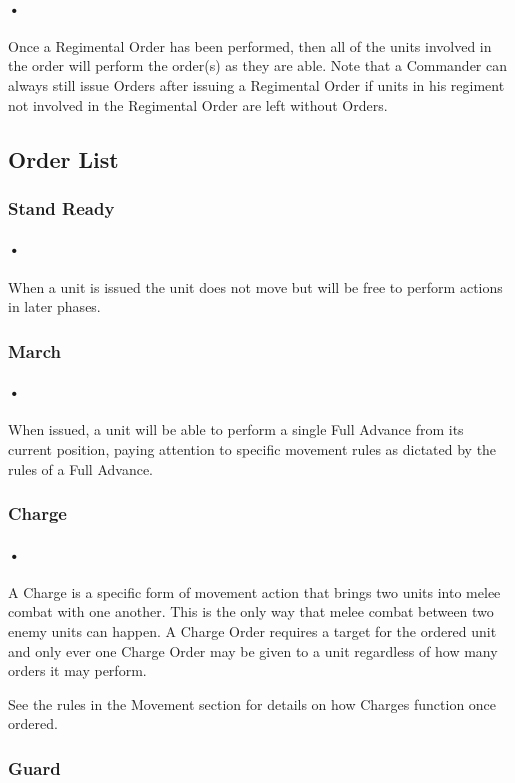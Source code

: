 \documentclass{article}
\begin{document}
\paragraph{•}
Once a Regimental Order has been performed, then all of the units involved in the order will perform the order(s) as they are able. Note that a Commander can always still issue Orders after issuing a Regimental Order if units in his regiment not involved in the Regimental Order are left without Orders.
\subsection{Order List}
\subsubsection{Stand Ready}
\paragraph{•}
When a unit is issued the unit does not move but will be free to perform actions in later phases.
\subsubsection{March}
\paragraph{•}
When issued, a unit will be able to perform a single Full Advance from its current position, paying attention to specific movement rules as dictated by the rules of a Full Advance.
\subsubsection{Charge}
\paragraph{•}
A Charge is a specific form of movement action that brings two units into melee combat with one another. This is the only way that melee combat between two enemy units can happen. A Charge Order requires a target for the ordered unit and only ever one Charge Order may be given to a unit regardless of how many orders it may perform.

See the rules in the Movement section for details on how Charges function once ordered.
\subsubsection{Guard}
\end{document}
